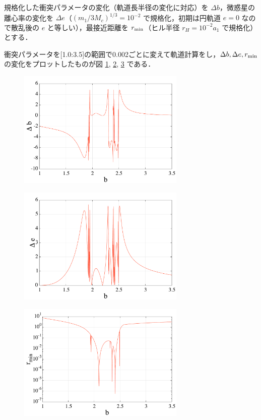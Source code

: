 \documentclass[11pt,a4paper,oneside,onecolumn]{jreport}
\begin{document}
規格化した衝突パラメータの変化（軌道長半径の変化に対応）を $\Delta b$，微惑星の離心率の変化を $\Delta e$（$(m_1 / 3 M_c)^{1/3} = 10^{-2}$ で規格化，初期は円軌道 $e = 0$ なので散乱後の $e$ と等しい），最接近距離を $r_{\rm min}$（ヒル半径 $r_H = 10^{-2} a_1$ で規格化）とする．

衝突パラメータを[1.0:3.5]の範囲で0.002ごとに変えて軌道計算をし，$\Delta b, \Delta e, r_{\rm min}$ の変化をプロットしたものが図 \ref{fig:delta_b}, \ref{fig:delta_e}, \ref{fig:r_min} である．

\begin{figure}[H]
\centering
\includegraphics[width=8cm]{./image/planetesimal_delta_b.pdf}
\caption{\label{fig:delta_b}}
\end{figure}

\begin{figure}[H]
\centering
\includegraphics[width=8cm]{./image/planetesimal_delta_e.pdf}
\caption{\label{fig:delta_e}}
\end{figure}

\begin{figure}[H]
\centering
\includegraphics[width=8cm]{./image/planetesimal_r_min.pdf}
\caption{\label{fig:r_min}}
\end{figure}
\end{document}
